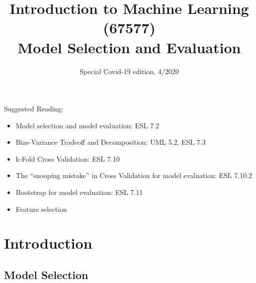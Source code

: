 \documentclass[11pt]{article}
\title{{\large{Introduction to Machine Learning (67577) \\
\vphantom{} Model Selection and Evaluation }}}
\date{Special Covid-19 edition, 4/2020}
\begin{document}
\maketitle

\tableofcontents
\pagebreak

Suggested Reading:
\begin{itemize}
  \item Model selection and model evaluation: ESL 7.2
  \item Bias-Variance Tradeoff and Decomposition: UML 5.2, ESL 7.3
  \item k-Fold Cross Validation: ESL 7.10
  \item The ``snooping mistake'' in Cross Validation for model evaluation: ESL 7.10.2
  \item Bootstrap for model evaluation: ESL 7.11
  \item Feature selection
\end{itemize}


\section{Introduction}

\subsection{Model Selection}
\end{document}
